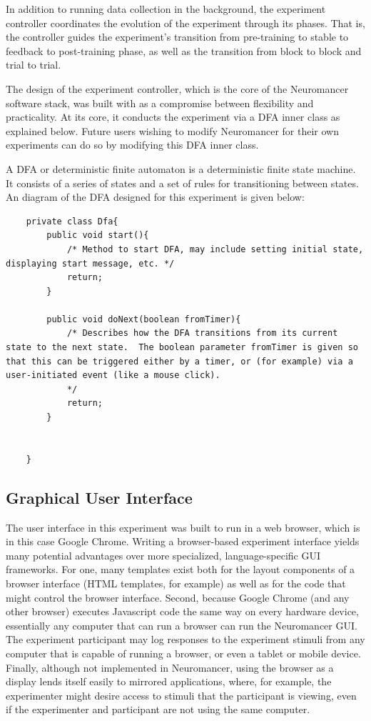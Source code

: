 \documentclass[11pt]{report}
\begin{document}
In addition to running data collection in the background, the experiment controller coordinates the evolution of the experiment through its phases. That is, the controller guides the experiment's transition from pre-training to stable to feedback to post-training phase, as well as the transition from block to block and trial to trial.   

The design of the experiment controller, which is the core of the Neuromancer software stack, was built with as a compromise between flexibility and practicality.  At its core, it conducts the experiment via a DFA inner class as explained below.  Future users wishing to modify Neuromancer for their own experiments can do so by modifying this DFA inner class.  

A DFA or deterministic finite automaton is a deterministic finite state machine.  It consists of a series of states and a set of rules for transitioning between states.  An diagram of the DFA designed for this experiment is given below:

\begin{lstlisting}
	private class Dfa{
		public void start(){
			/* Method to start DFA, may include setting initial state, displaying start message, etc. */
			return;
		}
		
		public void doNext(boolean fromTimer){
			/* Describes how the DFA transitions from its current state to the next state.  The boolean parameter fromTimer is given so that this can be triggered either by a timer, or (for example) via a user-initiated event (like a mouse click).
			*/
			return;
		}
		
		
	}
\end{lstlisting}

\subsection{Graphical User Interface}
	The user interface in this experiment was built to run in a web browser, which is in this case Google Chrome.  Writing a browser-based experiment interface yields many potential advantages over more specialized, language-specific GUI frameworks.  For one, many templates exist both for the layout components of a browser interface (HTML templates, for example) as well as for the code that might control the browser interface.  Second, because Google Chrome (and any other browser) executes Javascript code the same way on every hardware device, essentially any computer that can run a browser can run the Neuromancer GUI.  The experiment participant may log responses to the experiment stimuli from any computer that is capable of running a browser, or even a tablet or mobile device.  Finally, although not implemented in Neuromancer, using the browser as a display lends itself easily to mirrored applications, where, for example, the experimenter might desire access to stimuli that the participant is viewing, even if the experimenter and participant are not using the same computer.
\end{document}
